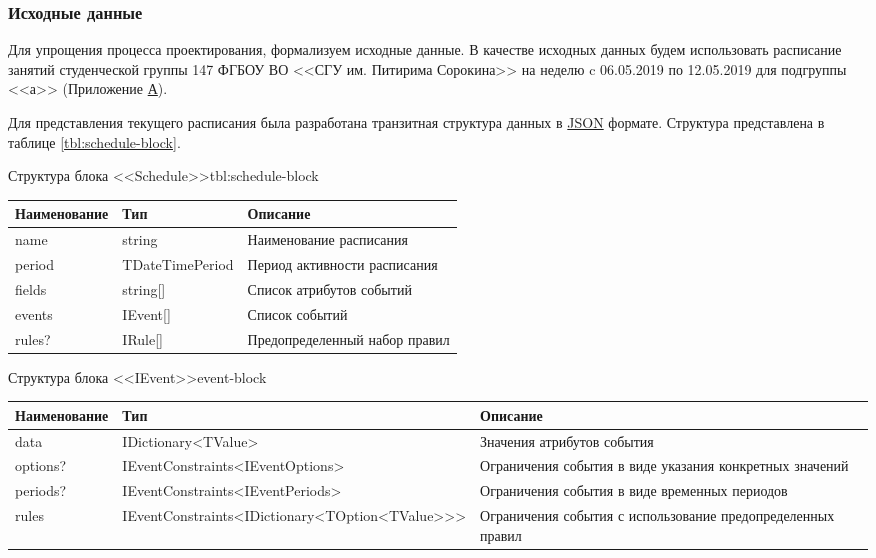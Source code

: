 \subsubsection{Исходные данные}

Для упрощения процесса проектирования, формализуем исходные данные.
В качестве исходных данных будем использовать расписание занятий студенческой группы 147 ФГБОУ ВО <<СГУ им. Питирима Сорокина>> на неделю c 06.05.2019 по 12.05.2019 для подгруппы <<а>> (Приложение \hyperlink{app:A}{А}).

Для представления текущего расписания была разработана транзитная структура данных в \hyperlink{json}{JSON} формате.
Структура представлена в таблице \ref{tbl:schedule-block}.

\begin{tbl}{Структура блока <<Schedule>>}{tbl:schedule-block}
  \begin{tabularx}{\textwidth}{| p{3cm} | p{3cm} | X |}
  \hline Наименование & Тип             & Описание                      \\
  \hline name         & string          & Наименование расписания       \\
  \hline period       & TDateTimePeriod & Период активности расписания  \\
  \hline fields       & string[]        & Список атрибутов событий      \\
  \hline events       & IEvent[]        & Список событий                \\
  \hline rules?       & IRule[]         & Предопределенный набор правил \\
  \hline
  \end{tabularx}
\end{tbl}

\begin{tbl}{Структура блока <<IEvent>>}{event-block}
  \begin{tabularx}{\textwidth}{| p{3cm} | p{6cm} | X |}
  \hline Наименование & Тип                                                          & Описание                                                    \\
  \hline data         & IDictionary<TValue>                                          & Значения атрибутов события                                  \\
  \hline options?     & IEventConstraints<IEventOptions>                             & Ограничения события в виде указания конкретных значений     \\
  \hline periods?     & IEventConstraints<IEventPeriods>                             & Ограничения события в виде временных периодов               \\
  \hline rules        & IEventConstraints\newline <IDictionary<TOption<TValue>{}>{}> & Ограничения события с использование предопределенных правил \\
  \hline
  \end{tabularx}
\end{tbl}

